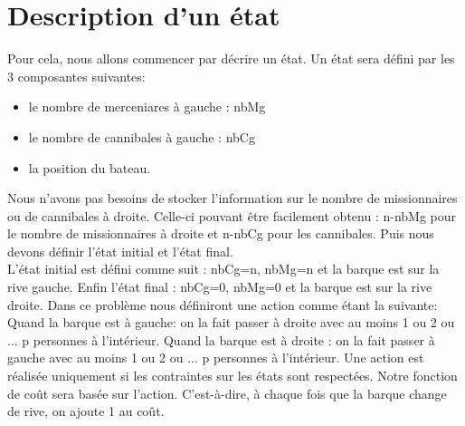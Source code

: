 \documentclass[a4paper, 12pt, french,oneside]{book}
\begin{document}
\section{Description d'un état}
Pour cela, nous allons commencer par décrire un état. Un état sera défini par les 3 composantes suivantes:
\begin{itemize}
    \item le nombre de merceniares à gauche : nbMg
    \item le nombre de cannibales à gauche : nbCg
    \item la position du bateau.
\end{itemize}
Nous n'avons pas besoins de stocker l'information sur le nombre de missionnaires ou de cannibales à droite. Celle-ci pouvant être facilement obtenu : n-nbMg pour le nombre de missionnaires à droite et n-nbCg pour les cannibales. Puis nous devons définir l'état initial et l'état final. \\
L'état initial est défini comme suit : nbCg=n, nbMg=n et la barque est sur la rive gauche. Enfin l'état final : nbCg=0, nbMg=0 et la barque est sur la rive droite. Dans ce problème nous définiront une action comme étant la suivante: Quand la barque est à gauche: on la fait passer à droite avec au moins 1 ou 2 ou ... p personnes à l'intérieur. Quand la barque est à droite : on la fait passer à gauche avec au moins 1 ou 2 ou ... p personnes à l'intérieur. Une action est réalisée uniquement si les contraintes sur les états sont respectées. Notre fonction de coût sera basée sur l'action. C'est-à-dire, à chaque fois que la barque change de rive, on ajoute 1 au coût.
\end{document}

